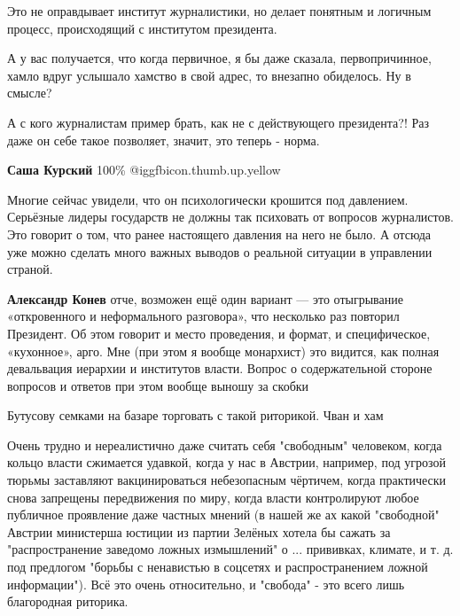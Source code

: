 \begin{itemize}
\begin{itemize}
Это не оправдывает институт журналистики, но делает понятным и логичным
процесс, происходящий с институтом президента.

А у вас получается, что когда первичное, я бы даже сказала, первопричинное,
хамло вдруг услышало хамство в свой адрес, то внезапно обиделось. Ну в смысле?

А с кого журналистам пример брать, как не с действующего президента?! Раз даже
он себе такое позволяет, значит, это теперь - норма.

\textbf{Саша Курский} 100\%  @igg{fbicon.thumb.up.yellow} 
\end{itemize} %


Многие сейчас увидели, что он психологически крошится под давлением. Серьёзные
лидеры государств не должны так психовать от вопросов журналистов. Это говорит
о том, что ранее настоящего давления на него не было. А отсюда уже можно
сделать много важных выводов о реальной ситуации в управлении страной.

\begin{itemize} %
\textbf{Александр Конев} отче, возможен ещё один вариант — это отыгрывание «откровенного и неформального разговора», что несколько раз повторил Президент. Об этом говорит и место проведения, и формат, и специфическое, «кухонное», арго. Мне (при этом я вообще монархист) это видится, как полная девальвация иерархии и институтов власти. Вопрос о содержательной стороне вопросов и ответов при этом вообще выношу за скобки
\end{itemize} %

Бутусову семками на базаре торговать с такой риторикой. Чван и хам


Очень трудно и нереалистично даже считать себя "свободным" человеком, когда
кольцо власти сжимается удавкой, когда у нас в Австрии, например, под угрозой
тюрьмы заставляют вакцинироваться небезопасным чёртичем, когда практически
снова запрещены передвижения по миру, когда власти контролируют любое публичное
проявление даже частных мнений (в нашей же ах какой "свободной" Австрии
министерша юстиции из партии Зелёных хотела бы сажать за "распространение
заведомо ложных измышлений" о ... прививках, климате, и т. д. под предлогом
"борьбы с ненавистью в соцсетях и распространением ложной информации"). Всё это
очень относительно, и "свобода" - это всего лишь благородная риторика.


\end{itemize}

